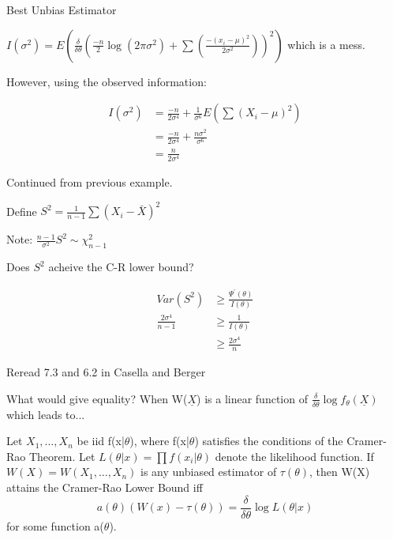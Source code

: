 \documentclass[11pt,fleqn]{book} %
\begin{document}
\begin{section}{Best Unbias Estimator}
\begin{example}
$I(\sigma^2) = E\left(\frac{\delta}{\delta \theta}\left(\frac{-n}{2} \log(2\pi\sigma^2) +\sum \left(\frac{-(x_i-\mu)^2}{2\sigma^2}\right)\right)^2 \right)$
which is a mess. 

However, using the observed information:

\begin{align*}
I(\sigma^2) &= \frac{-n}{2\sigma^4} + \frac{1}{\sigma^6} E\left(\sum(X_i-\mu)^2\right)\\
	&= \frac{-n}{2\sigma^4}+\frac{n\sigma^2}{\sigma^6}\\
	&= \frac{n}{2\sigma^4}
\end{align*}

\end{example}

\begin{example}
	Continued from previous example. 

	Define $S^2 = \frac{1}{n-1}\sum (X_i - \bar{X})^2$

	Note: $\frac{n-1}{\sigma^2}S^2 \sim \chi^2_{n-1}$

	Does $S^2$ acheive the C-R lower bound?

	\begin{align*}
	Var(S^2) &\ge \frac{\Psi^\prime(\theta)}{I(\theta)}\\
		\frac{2\sigma^4}{n-1} &\ge \frac{1}{I(\theta)}\\
		&\ge \frac{2\sigma^4}{n}
	\end{align*}
\end{example}
\begin{remark}
	Reread 7.3 and 6.2 in Casella and Berger
\end{remark}
What would give equality? When W($\underline{X}$) is a linear function of $\frac{\delta}{\delta \theta} \log f_\theta(\underline{X})$ which leads to... 
\begin{corollary}[Attainment]
	Let $X_1,\dots,X_n$ be iid f(x|$\theta$), where f(x|$\theta$) satisfies the conditions of the Cramer-Rao Theorem. Let $L(\theta|x) = \prod f(x_i|\theta)$ denote the likelihood function. If $W(X) = W(X_1,\dots,X_n)$ is any unbiased estimator of $\tau(\theta)$, then W(X) attains the Cramer-Rao Lower Bound iff
	$$ a(\theta)\left(W(x) - \tau(\theta)\right) = \frac{\delta}{\delta \theta} \log L(\theta|x) $$
	for some function a($\theta$).
\end{corollary}
\end{section}
\end{document}
